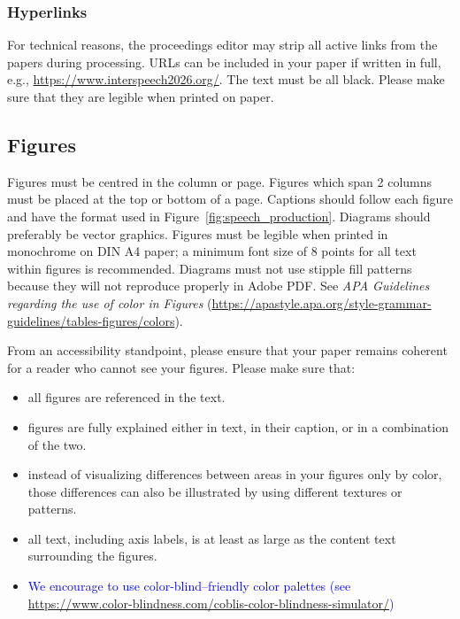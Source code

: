 \documentclass[cameraready]{Interspeech}
\newcommand{\blue}[1]{\textcolor{blue}{#1}}
\begin{document}
\subsubsection{Hyperlinks}

For technical reasons, the proceedings editor may strip all active links from the papers during processing. URLs can be included in your paper if written in full, e.g., \url{https://www.interspeech2026.org/}. The text must be all black. Please make sure that they are legible when printed on paper.


\subsection{Figures}\label{sec:figures}

Figures must be centred in the column or page. Figures which span 2 columns must be placed at the top or bottom of a page.
Captions should follow each figure and have the format used in Figure~\ref{fig:speech_production}. Diagrams should preferably be vector graphics. Figures must be legible when printed in monochrome on DIN A4 paper; a minimum font size of  8 points for all text within figures is recommended. Diagrams must not use stipple fill patterns because they will not reproduce properly in Adobe PDF. See \textit{APA Guidelines regarding the use of color in Figures} (\url{https://apastyle.apa.org/style-grammar-guidelines/tables-figures/colors}).

From an accessibility standpoint, please ensure that your paper remains coherent for a reader who cannot see your figures. Please make sure that:
    \begin{itemize}
        \item all figures are referenced in the text.
        \item figures are fully explained either in text, in their caption, or in a combination of the two.
        \item instead of visualizing differences between areas in your figures only by color, those differences can also be illustrated by using different textures or patterns.
        \item all text, including axis labels, is at least as large as the content text surrounding the figures.
        \item \blue{We encourage to use color-blind–friendly color palettes (see \url{https://www.color-blindness.com/coblis-color-blindness-simulator/})}
    \end{itemize}
\end{document}

